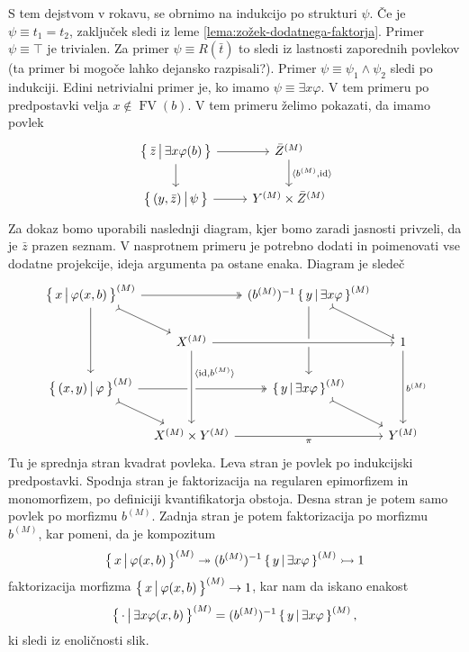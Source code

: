 \documentclass[../kategoricna_logika.tex]{subfiles}
\begin{document}
\begin{dokaz}
  S tem dejstvom v rokavu, se obrnimo na indukcijo po strukturi
  $\psi$.  Če je $\psi \equiv t_1 = t_2$, zaključek sledi iz leme
  \ref{lema:zožek-dodatnega-faktorja}. Primer $\psi \equiv \top$ je
  trivialen.  Za primer $\psi \equiv R(\bar{t})$ to sledi iz lastnosti
  zaporednih povlekov (ta primer bi mogoče lahko dejansko razpisali?).
  Primer $\psi \equiv \psi_1 \land \psi_2$ sledi po indukciji.  Edini
  netrivialni primer je, ko imamo $\psi \equiv \exists x \varphi$.  V
  tem primeru po predpostavki velja $x \notin \operatorname{FV}(b)$.
  V tem primeru želimo pokazati, da imamo povlek
  \begin{equation*}
    \begin{tikzcd}
      \setb{\bar{z}}{\exists x \varphi(b)} \ar[d] \ar[r] & \interp{\bar{Z}} \ar[d, "\fprod{b^{(M)}, \mathrm{id}}"] \\
      \setb{(y,\bar{z})}{\psi} \ar[r] & Y^{(M)} \times \bar{Z}^{(M)}
    \end{tikzcd}
  \end{equation*}
  Za dokaz bomo uporabili naslednji diagram, kjer bomo zaradi jasnosti
  privzeli, da je $\bar{z}$ prazen seznam.  V nasprotnem primeru je
  potrebno dodati in poimenovati vse dodatne projekcije, ideja
  argumenta pa ostane enaka. Diagram je sledeč
  \begin{equation*}
    \begin{tikzcd}[column sep=tiny]
      \setb{x}{\varphi (x, b)}^{(M)} \ar[dd] \ar[dr, tail] \ar[rr, two heads] & & ( b^{(M)} )^{-1} \setb{y}{\exists x \varphi}^{(M)} \ar[dd] \ar[dr, tail] & \\
      & X^{(M)}  \ar[rr, crossing over] & & 1 \ar[dd, "b^{(M)}"] \\
      \setb{(x,y)}{\varphi}^{(M)} \ar[dr, tail] \ar[rr, two heads] & & \setb{y}{\exists x \varphi}^{(M)} \ar[dr, tail] & \\
      & X^{(M)} \times Y^{(M)} \ar[from=uu, pos=0.3, crossing over,
      "\fprod{\mathrm{id}, b^{(M)}}"] \ar[rr, "\pi"'] & & Y^{(M)}
    \end{tikzcd}
  \end{equation*}
  Tu je sprednja stran kvadrat povleka. Leva stran je povlek po
  indukcijski predpostavki.  Spodnja stran je faktorizacija na
  regularen epimorfizem in monomorfizem, po definiciji kvantifikatorja
  obstoja.  Desna stran je potem samo povlek po morfizmu $b^{(M)}$.
  Zadnja stran je potem faktorizacija po morfizmu $b^{(M)}$, kar
  pomeni, da je kompozitum
  $$\left\lbrace\, x \,\middle|\, \varphi (x, b) \,\right\rbrace^{(M)} \twoheadrightarrow ( b^{(M)} )^{-1} \left\lbrace\, y \,\middle|\, \exists x \varphi \,\right\rbrace^{(M)} \rightarrowtail 1$$
  faktorizacija morfizma $\left\lbrace\, x \,\middle|\, \varphi (x, b) \,\right\rbrace^{(M)} \to 1$, kar
  nam da iskano enakost
  $$\left\lbrace\, \cdot \,\middle|\, \exists x \varphi(x,b) \,\right\rbrace^{(M)} = ( b^{(M)} )^{-1} \left\lbrace\, y \,\middle|\, \exists x \varphi \,\right\rbrace^{(M)},$$
  ki sledi iz enoličnosti slik.
\end{dokaz}
\end{document}
